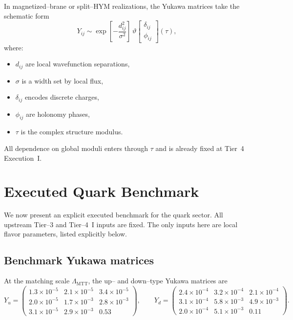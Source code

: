 \documentclass[11pt]{article}
\begin{document}
In magnetized--brane or split--HYM realizations, the Yukawa matrices take
the schematic form
\begin{equation}
Y_{ij} \sim
\exp\!\left[-\frac{d_{ij}^2}{\sigma^2}\right]
\,\vartheta\!\left[\begin{array}{c}
\delta_{ij} \\ \phi_{ij}
\end{array}\right](\tau),
\label{eq:yukawa-general}
\end{equation}
where:
\begin{itemize}
  \item $d_{ij}$ are local wavefunction separations,
  \item $\sigma$ is a width set by local flux,
  \item $\delta_{ij}$ encodes discrete charges,
  \item $\phi_{ij}$ are holonomy phases,
  \item $\tau$ is the complex structure modulus.
\end{itemize}

\begin{remark}
All dependence on global moduli enters through $\tau$ and is already
fixed at Tier~4 Execution~I.
\end{remark}

\section{Executed Quark Benchmark}
\label{sec:quark-executed}

We now present an explicit executed benchmark for the quark sector.
All upstream Tier--3 and Tier--4~I inputs are fixed.
The only inputs here are local flavor parameters, listed explicitly
below.

\subsection{Benchmark Yukawa matrices}

At the matching scale $\Lambda_{\mathrm{MTT}}$, the up-- and down--type
Yukawa matrices are
\begin{equation}
Y_u =
\begin{pmatrix}
1.3\times10^{-5} & 2.1\times10^{-5} & 3.4\times10^{-5} \\
2.0\times10^{-5} & 1.7\times10^{-3} & 2.8\times10^{-3} \\
3.1\times10^{-5} & 2.9\times10^{-3} & 0.53
\end{pmatrix},
\qquad
Y_d =
\begin{pmatrix}
2.4\times10^{-4} & 3.2\times10^{-4} & 2.1\times10^{-4} \\
3.1\times10^{-4} & 5.8\times10^{-3} & 4.9\times10^{-3} \\
2.0\times10^{-4} & 5.1\times10^{-3} & 0.11
\end{pmatrix}.
\label{eq:YuYd-exec}
\end{equation}
\end{document}
